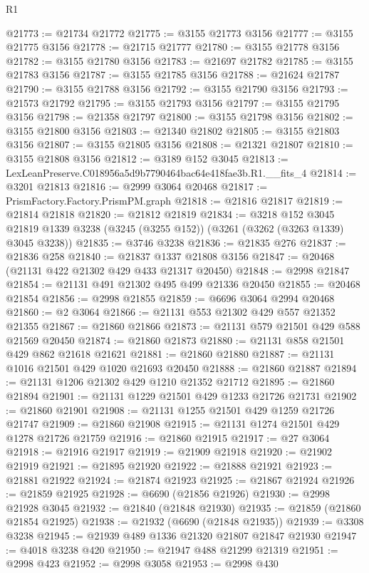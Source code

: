 \begin{lexlean}{R1}
\begin{coremodule}
@21773 := @21734 @21772
@21775 := @3155 @21773 @3156
@21777 := @3155 @21775 @3156
@21778 := @21715 @21777
@21780 := @3155 @21778 @3156
@21782 := @3155 @21780 @3156
@21783 := @21697 @21782
@21785 := @3155 @21783 @3156
@21787 := @3155 @21785 @3156
@21788 := @21624 @21787
@21790 := @3155 @21788 @3156
@21792 := @3155 @21790 @3156
@21793 := @21573 @21792
@21795 := @3155 @21793 @3156
@21797 := @3155 @21795 @3156
@21798 := @21358 @21797
@21800 := @3155 @21798 @3156
@21802 := @3155 @21800 @3156
@21803 := @21340 @21802
@21805 := @3155 @21803 @3156
@21807 := @3155 @21805 @3156
@21808 := @21321 @21807
@21810 := @3155 @21808 @3156
@21812 := @3189 @152 @3045
@21813 := LexLeanPreserve.C018956a5d9b7790464bac64e418fae3b.R1.__fits_4
@21814 := @3201 @21813
@21816 := @2999 @3064 @20468
@21817 := PrismFactory.Factory.PrismPM.graph
@21818 := @21816 @21817
@21819 := @21814 @21818
@21820 := @21812 @21819
@21834 := @3218
    @152
    @3045
    @21819
    @1339
    @3238
    (@3245 (@3255 @152))
    (@3261 (@3262 (@3263 @1339) @3045 @3238))
@21835 := @3746 @3238
@21836 := @21835 @276
@21837 := @21836 @258
@21840 := @21837 @1337 @21808 @3156
@21847 := @20468 (@21131 @422 @21302 @429 @433 @21317 @20450)
@21848 := @2998 @21847
@21854 := @21131 @491 @21302 @495 @499 @21336 @20450
@21855 := @20468 @21854
@21856 := @2998 @21855
@21859 := @6696 @3064 @2994 @20468
@21860 := @2 @3064
@21866 := @21131 @553 @21302 @429 @557 @21352 @21355
@21867 := @21860 @21866
@21873 := @21131 @579 @21501 @429 @588 @21569 @20450
@21874 := @21860 @21873
@21880 := @21131 @858 @21501 @429 @862 @21618 @21621
@21881 := @21860 @21880
@21887 := @21131 @1016 @21501 @429 @1020 @21693 @20450
@21888 := @21860 @21887
@21894 := @21131 @1206 @21302 @429 @1210 @21352 @21712
@21895 := @21860 @21894
@21901 := @21131 @1229 @21501 @429 @1233 @21726 @21731
@21902 := @21860 @21901
@21908 := @21131 @1255 @21501 @429 @1259 @21726 @21747
@21909 := @21860 @21908
@21915 := @21131 @1274 @21501 @429 @1278 @21726 @21759
@21916 := @21860 @21915
@21917 := @27 @3064
@21918 := @21916 @21917
@21919 := @21909 @21918
@21920 := @21902 @21919
@21921 := @21895 @21920
@21922 := @21888 @21921
@21923 := @21881 @21922
@21924 := @21874 @21923
@21925 := @21867 @21924
@21926 := @21859 @21925
@21928 := @6690 (@21856 @21926)
@21930 := @2998 @21928 @3045
@21932 := @21840 (@21848 @21930)
@21935 := @21859 (@21860 @21854 @21925)
@21938 := @21932 (@6690 (@21848 @21935))
@21939 := @3308 @3238
@21945 := @21939 @489 @1336 @21320 @21807 @21847 @21930
@21947 := @4018 @3238 @420
@21950 := @21947 @488 @21299 @21319
@21951 := @2998 @423
@21952 := @2998 @3058
@21953 := @2998 @430

\end{coremodule}
\end{lexlean}

